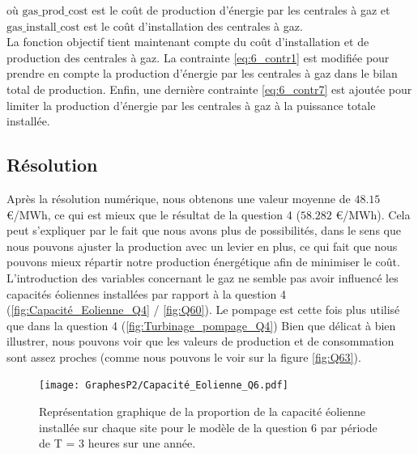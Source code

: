 \documentclass{article}
\begin{document}
\noindent où $\mathrm{gas\_prod\_cost}$ est le coût de production d'énergie par les centrales à gaz et $\mathrm{gas\_install\_cost}$ est le coût d'installation des centrales à gaz.\\
La fonction objectif tient maintenant compte du coût d'installation et de production des centrales à gaz. La contrainte \eqref{eq:6_contr1} est modifiée pour prendre en compte la production d'énergie par les centrales à gaz dans le bilan total de production. 
Enfin, une dernière contrainte \eqref{eq:6_contr7} est ajoutée pour limiter la production d'énergie par les centrales à gaz à la puissance totale installée.

\pagebreak

\subsection*{Résolution}
Après la résolution numérique, nous obtenons une valeur moyenne de $\mathbf{48.15}$ \euro/MWh, ce qui est mieux que 
le résultat de la question 4 ($\mathbf{58.282}$ \euro/MWh). Cela peut s'expliquer par le fait que nous
avons plus de possibilités, dans le sens que nous pouvons ajuster la production avec un levier en plus,
ce qui fait que nous pouvons mieux répartir notre production énergétique afin de minimiser le coût. \\
L'introduction des variables concernant le gaz ne semble pas avoir influencé les capacités éoliennes installées 
par rapport à la question 4 (\autoref{fig:Capacité_Eolienne_Q4} / \autoref{fig:Q60}). 
Le pompage est cette fois plus utilisé que dans la question 4 (\autoref{fig:Turbinage_pompage_Q4})
Bien que délicat à bien illustrer, nous pouvons voir que les valeurs de production et de consommation sont 
assez proches (comme nous pouvons le voir sur la figure \ref{fig:Q63}).

\begin{figure}[h!]
    \centering
    \texttt{[image: GraphesP2/Capacité\_Eolienne\_Q6.pdf]}
    \caption{Représentation graphique de la proportion de la capacité éolienne installée sur chaque site pour le modèle de la question 6 par période
    de T = 3 heures sur une année.}
    \label{fig:Q60}
\end{figure}
\end{document}
